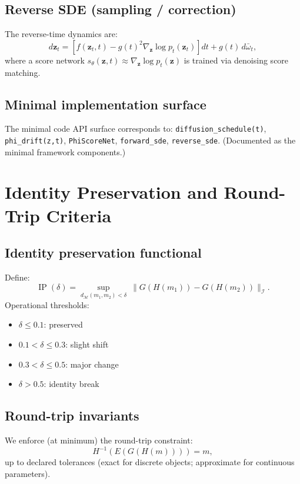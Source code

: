 \documentclass[12pt]{amsart}
\numberwithin{equation}{section}
\newcommand{\cM}{\mathcal{M}}
\newcommand{\cI}{\mathcal{I}}
\DeclareMathOperator{\IP}{IP}
\begin{document}
\subsection{Reverse SDE (sampling / correction)}
The reverse-time dynamics are:
\begin{equation}
d\mathbf{z}_t =
\left[f(\mathbf{z}_t,t)-g(t)^2\nabla_{\mathbf{z}}\log p_t(\mathbf{z}_t)\right]dt
+ g(t)\,d\bar{\omega}_t,
\end{equation}
where a score network $s_\theta(\mathbf{z},t)\approx \nabla_{\mathbf{z}}\log p_t(\mathbf{z})$
is trained via denoising score matching.
\subsection{Minimal implementation surface}
The minimal code API surface corresponds to:
\texttt{diffusion\_schedule(t)}, \texttt{phi\_drift(z,t)}, \texttt{PhiScoreNet},
\texttt{forward\_sde}, \texttt{reverse\_sde}. (Documented as the minimal framework components.)
\section{Identity Preservation and Round-Trip Criteria}
\subsection{Identity preservation functional}
Define:
\[
\IP(\delta)=\sup_{d_{\cM}(m_1,m_2)<\delta}\ \big\|G(H(m_1))-G(H(m_2))\big\|_{\cI}.
\]
Operational thresholds:
\begin{itemize}
\item $\delta\le 0.1$: preserved
\item $0.1<\delta\le 0.3$: slight shift
\item $0.3<\delta\le 0.5$: major change
\item $\delta>0.5$: identity break
\end{itemize}
\subsection{Round-trip invariants}
We enforce (at minimum) the round-trip constraint:
\[
H^{-1}\!\left(E\!\left(G(H(m))\right)\right)=m,
\]
up to declared tolerances (exact for discrete objects; approximate for continuous parameters).
\end{document}
